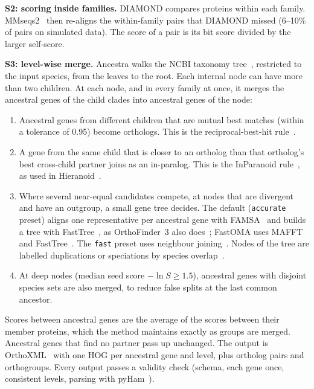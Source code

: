\textbf{S2: scoring inside families.} DIAMOND compares proteins within each family. MMseqs2~\cite{steinegger2017mmseqs2} then re-aligns the within-family pairs that DIAMOND missed (6--10\% of pairs on simulated data). The score of a pair is its bit score divided by the larger self-score.

\textbf{S3: level-wise merge.} Ancestra walks the NCBI taxonomy tree~\cite{schoch2020ncbitaxonomy}, restricted to the input species, from the leaves to the root. Each internal node can have more than two children. At each node, and in every family at once, it merges the ancestral genes of the child clades into ancestral genes of the node:
\begin{enumerate}
\item Ancestral genes from different children that are mutual best matches (within a tolerance of 0.95) become orthologs. This is the reciprocal-best-hit rule~\cite{remm2001inparanoid}.
\item A gene from the same child that is closer to an ortholog than that ortholog's best cross-child partner joins as an in-paralog. This is the InParanoid rule~\cite{remm2001inparanoid}, as used in Hieranoid~\cite{schreiber2013hieranoid}.
\item Where several near-equal candidates compete, at nodes that are divergent and have an outgroup, a small gene tree decides. The default (\texttt{accurate} preset) aligns one representative per ancestral gene with FAMSA~\cite{deorowicz2016famsa} and builds a tree with FastTree~\cite{price2010fasttree2}, as OrthoFinder~3 also does~\cite{emms2026orthofinder3}; FastOMA uses MAFFT and FastTree~\cite{majidian2025fastoma}. The \texttt{fast} preset uses neighbour joining~\cite{saitou1987nj}. Nodes of the tree are labelled duplications or speciations by species overlap~\cite{huertacepas2007overlap}.
\item At deep nodes (median seed score $-\ln S \geq 1.5$), ancestral genes with disjoint species sets are also merged, to reduce false splits at the last common ancestor.
\end{enumerate}
Scores between ancestral genes are the average of the scores between their member proteins, which the method maintains exactly as groups are merged. Ancestral genes that find no partner pass up unchanged. The output is OrthoXML~\cite{schmitt2011orthoxml} with one HOG per ancestral gene and level, plus ortholog pairs and orthogroups. Every output passes a validity check (schema, each gene once, consistent levels, parsing with pyHam~\cite{train2019pyham}).

